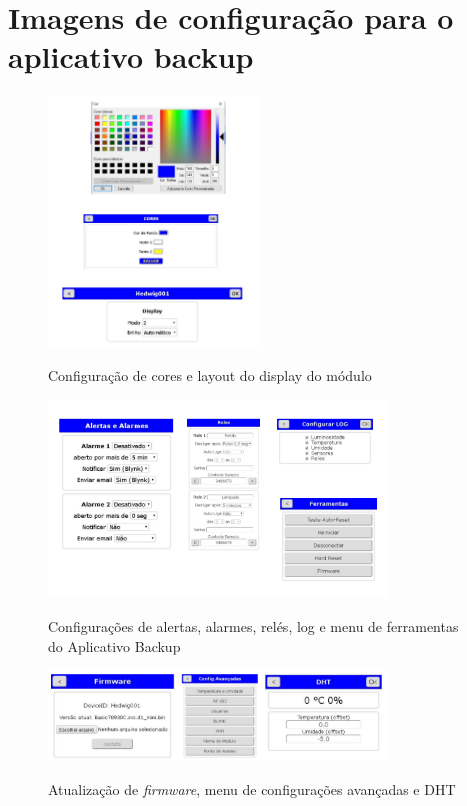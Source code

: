 \chapter{Imagens de configuração para o aplicativo backup}
\label{attachmentsImagensBackup}

\begin{figure}[H]
	\centering
	\caption{Configuração de cores e layout do display do módulo}
	\includegraphics[width=0.5\textwidth]{configCoresLayoutAppBackup}
	\label{fig:configCoresLayoutAppBackups}
\end{figure}

\begin{figure}[H]
	\centering
	\caption{Configurações de alertas, alarmes, relés, log e menu de ferramentas do Aplicativo Backup}
	\includegraphics[width=0.8\textwidth]{configalertasreleslogferramentas}
	\label{fig:configalertasreleslogferramentas}
\end{figure}

\begin{figure}[H]
	\centering
	\caption{Atualização de \emph{firmware}, menu de configurações avançadas e DHT}
	\includegraphics[width=0.8\textwidth]{firmwareconfigavancadasDHT}
	\label{fig:firmwareconfigavancadasDHT}
\end{figure}

